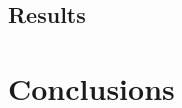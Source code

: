 \documentclass[11pt]{article}
\newcounter{algo}
\begin{document}
\subsection{Results}



\section*{Conclusions}



\end{document}
